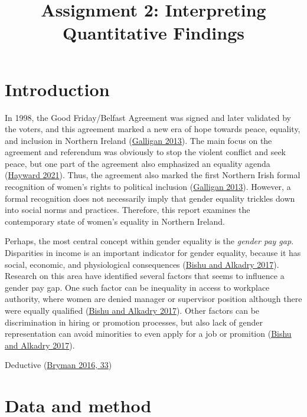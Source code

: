 \documentclass[
]{article}
\title{Assignment 2: Interpreting Quantitative Findings}
\subtitle{\hfill\break
University of Glasgow\\
\strut \\
Student ID: 2819052\\
Course: Quantitative Methods\\
Number of words: 381}
\author{}
\date{\vspace{-2.5em}}
\begin{document}
\maketitle

\pagebreak

\setcounter{tocdepth}{2}
\tableofcontents

\pagebreak

\hypertarget{introduction}{%
\section{Introduction}\label{introduction}}

In 1998, the Good Friday/Belfast Agreement was signed and later
validated by the voters, and this agreement marked a new era of hope
towards peace, equality, and inclusion in Northern Ireland
(\protect\hyperlink{ref-galligan2013gender}{Galligan 2013}). The main
focus on the agreement and referendum was obviously to stop the violent
conflict and seek peace, but one part of the agreement also emphasized
an equality agenda (\protect\hyperlink{ref-Hayward2021}{Hayward 2021}).
Thus, the agreement also marked the first Northern Irish formal
recognition of women's rights to political inclusion
(\protect\hyperlink{ref-galligan2013gender}{Galligan 2013}). However, a
formal recognition does not necessarily imply that gender equality
trickles down into social norms and practices. Therefore, this report
examines the contemporary state of women's equality in Northern Ireland.

Perhaps, the most central concept within gender equality is the
\emph{gender pay gap}. Disparities in income is an important indicator
for gender equality, because it has social, economic, and physiological
consequences (\protect\hyperlink{ref-bishu2017gender}{Bishu and Alkadry
2017}). Research on this area have identified several factors that seems
to influence a gender pay gap. One such factor can be inequality in
access to workplace authority, where women are denied manager or
supervisor position although there were equally qualified
(\protect\hyperlink{ref-bishu2017gender}{Bishu and Alkadry 2017}). Other
factors can be discrimination in hiring or promotion processes, but also
lack of gender representation can avoid minorities to even apply for a
job or promition (\protect\hyperlink{ref-bishu2017gender}{Bishu and
Alkadry 2017}).

Deductive (\protect\hyperlink{ref-bryman2016social}{Bryman 2016, 33})

\hypertarget{data-and-method}{%
\section{Data and method}\label{data-and-method}}
\end{document}

